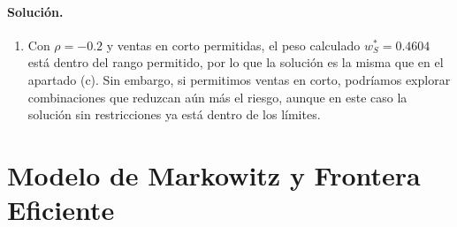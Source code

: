 \documentclass[12pt,a4paper]{article}
\newcommand{\E}{\mathbb{E}}
\newenvironment{solucion}{\paragraph{Solución.}}{}
\begin{document}
\begin{solucion}
\begin{enumerate}[label=\alph*)]
  Rentabilidad esperada:
  \[
  \E[r_p^*] = 0.4604 \times 0.10 + 0.5396 \times 0.09 = 0.04604 + 0.04856 = 0.09460 = 9.46\%
  \]

  Varianza:
  \[
  \sigma_p^{*2} = (0.4604)^2 \times (0.22)^2 + (0.5396)^2 \times (0.20)^2 + 2 \times 0.4604 \times 0.5396 \times (-0.2) \times 0.22 \times 0.20
  \]
  \[
  \sigma_p^{*2} = 0.2120 \times 0.0484 + 0.2912 \times 0.04 - 2 \times 0.2484 \times 0.0088
  \]
  \[
  \sigma_p^{*2} = 0.010260 + 0.011648 - 0.004372 = 0.017536
  \]
  \[
  \sigma_p^* = \sqrt{0.017536} = 0.1324 = 13.24\%
  \]

  \textbf{Observación importante:} Con correlación negativa, el riesgo de la cartera de mínima varianza (13.24\%) es significativamente menor que con correlación positiva (19.68\%), demostrando el poder de la diversificación cuando los activos están negativamente correlacionados.

  \item Con $\rho = -0.2$ y ventas en corto permitidas, el peso calculado $w_S^* = 0.4604$ está dentro del rango permitido, por lo que la solución es la misma que en el apartado (c). Sin embargo, si permitimos ventas en corto, podríamos explorar combinaciones que reduzcan aún más el riesgo, aunque en este caso la solución sin restricciones ya está dentro de los límites.
\end{enumerate}
\end{solucion}

\section{Modelo de Markowitz y Frontera Eficiente}
\end{document}
